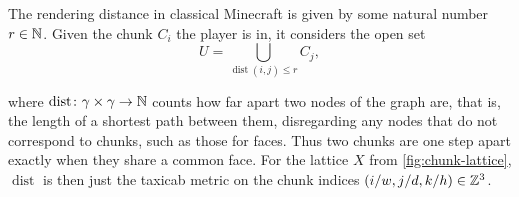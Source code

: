 The rendering distance in classical Minecraft is given by some natural number
$r \in \mathbb{N}$. Given the chunk $C_i$ the player is in, it considers the open set
\[
	U = \bigcup_{\operatorname{dist}(i,j) \le r} C_j,
\]
{%
	\newcommand{\topblock}[3]{\draw[blk, #3] (#1,#2) rectangle ++(1,1);}
	\newcommand{\toptree}[2]{%
		\foreach \u in {-1,0,1} {\foreach \v in {-1,0,1} {\topblock{#1+\u}{#2+\v}{leaves}}}
		\topblock{#1}{#2}{wood}%
	}
	\newcommand{\topentity}[3]{%
		\fill[white] (#1-0.9,#2-0.2) rectangle (#1+1.1,#2+1.75);
		\pic[scale=1/3] at (#1,#2) {#3};
	}
	\par\vspace{-\parskip}\noindent
	\begin{minipage}[t]{0.58\textwidth}
		\vspace{0pt}
		where $\operatorname{dist} \colon \gamma \times \gamma \to \mathbb{N}$ counts how far
		apart two nodes of the graph are, that is, the length of a shortest path
		between them, disregarding any nodes that do not correspond to chunks, such as
		those for faces. Thus two chunks are one step apart exactly when they share a
		common face. For the lattice $X$ from \cref{fig:chunk-lattice},
		$\operatorname{dist}$ is then just the taxicab metric on the chunk indices
		$(i/w, j/d, k/h) \in \mathbb{Z}^3$.


\end{minipage}}
